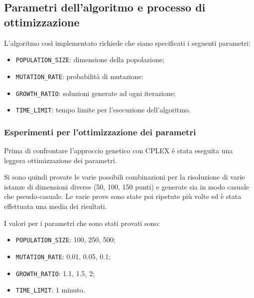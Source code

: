 \subsection{Parametri dell'algoritmo e processo di ottimizzazione}

L'algoritmo così implementato richiede che siano specificati i seguenti parametri:

\begin{itemize}
	\item\texttt{POPULATION\_SIZE}: dimensione della popolazione;
	\item\texttt{MUTATION\_RATE}: probabilità di mutazione:
	\item\texttt{GROWTH\_RATIO}: soluzioni generate ad ogni iterazione;
	\item\texttt{TIME\_LIMIT}: tempo limite per l'esecuzione dell'algoritmo.
\end{itemize}

\subsubsection{Esperimenti per l'ottimizzazione dei parametri}

Prima di confrontare l'approccio genetico con CPLEX è stata eseguita una leggera ottimizzazione dei parametri.

Si sono quindi provate le varie possibili combinazioni per la risoluzione di varie istanze di dimensioni diverse (50, 100, 150 punti) e generate sia in modo casuale che pseudo-casuale.
Le varie prove sono state poi ripetute più volte ed è stata effettuata una media dei risultati.

I valori per i parametri che sono stati provati sono:

\begin{itemize}
	\item \texttt{POPULATION\_SIZE}: 100, 250, 500;
	\item \texttt{MUTATION\_RATE}: 0.01, 0.05, 0.1;
	\item \texttt{GROWTH\_RATIO}: 1.1, 1.5, 2;
	\item \texttt{TIME\_LIMIT}: 1 minuto.
\end{itemize}



